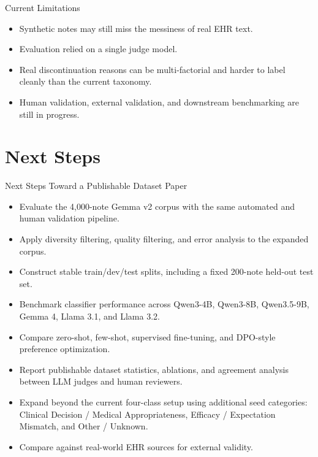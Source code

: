 \documentclass[aspectratio=169]{beamer}
\begin{document}
\begin{frame}{Current Limitations}
    \begin{itemize}
        \item Synthetic notes may still miss the messiness of real EHR text.
        \item Evaluation relied on a single judge model.
        \item Real discontinuation reasons can be multi-factorial and harder to label cleanly than the current taxonomy.
        \item Human validation, external validation, and downstream benchmarking are still in progress.
    \end{itemize}
\end{frame}

\section{Next Steps}

\begin{frame}{Next Steps Toward a Publishable Dataset Paper}
    \begin{itemize}
        \item Evaluate the 4,000-note Gemma v2 corpus with the same automated and human validation pipeline.
        \item Apply diversity filtering, quality filtering, and error analysis to the expanded corpus.
        \item Construct stable train/dev/test splits, including a fixed 200-note held-out test set.
        \item Benchmark classifier performance across Qwen3-4B, Qwen3-8B, Qwen3.5-9B, Gemma 4, Llama 3.1, and Llama 3.2.
        \item Compare zero-shot, few-shot, supervised fine-tuning, and DPO-style preference optimization.
        \item Report publishable dataset statistics, ablations, and agreement analysis between LLM judges and human reviewers.
        \item Expand beyond the current four-class setup using additional seed categories: Clinical Decision / Medical Appropriateness, Efficacy / Expectation Mismatch, and Other / Unknown.
        \item Compare against real-world EHR sources for external validity.
    \end{itemize}
\end{frame}
\end{document}
